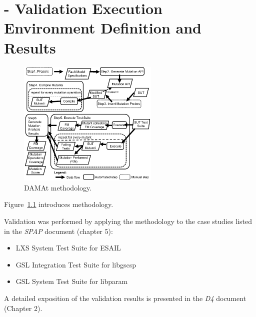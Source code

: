
\chapter{\DAMA - Validation Execution Environment Definition and Results}

\begin{figure}[t]
  \centering
  \includegraphics[width=0.6\textwidth]{images/dataDrivenBufferProcess.pdf}
      \caption{DAMAt methodology.}
      \label{fig:damat}
\end{figure}

Figure~\ref{fig:damat} introduces \DAMA methodology.

Validation was performed by applying the \DAMA methodology to the case studies listed in the \emph{SPAP} document (chapter 5):
\begin{itemize}
  \item LXS System Test Suite for ESAIL
  \item GSL Integration Test Suite for libgscsp
  \item GSL System Test Suite for libparam
\end{itemize}

A detailed exposition of the validation results is presented in the \emph{D4} document (Chapter 2).

\clearpage
